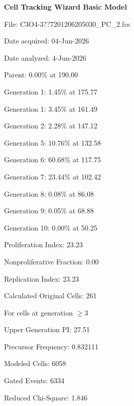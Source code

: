 \documentclass[UTF8,10pt,a4paper,fontset=fandol]{ctexart}
\begin{document}
\noindent
\begin{minipage}[t]{0.48\linewidth}
\centering
{}
\end{minipage}
\hfill
\begin{minipage}[t]{0.48\linewidth}
\small
\textbf{Cell Tracking Wizard Basic Model}

File: C3O4-3??7201206205030\_PC\_2.fcs

Date acquired: 04-Jun-2026

Date analyzed: 4-Jun-2026

Parent: 0.00\% at 190.00

Generation 1: 1.45\% at 175.77

Generation 1: 3.45\% at 161.49

Generation 2: 2.28\% at 147.12

Generation 5: 10.76\% at 132.58

Generation 6: 60.68\% at 117.75

Generation 7: 23.44\% at 102.42

Generation 8: 0.08\% at 86.08

Generation 9: 0.05\% at 68.88

Generation 10: 0.00\% at 50.25

\medskip
Proliferation Index: 23.23

Nonproliferative Fraction: 0.00

Replication Index: 23.23

Calculated Original Cells: 261

\medskip
For cells at generation $\geq 3$

Upper Generation PI: 27.51

Precursor Frequency: 0.832111

\medskip
Modeled Cells: 6058

Gated Events: 6334

Reduced Chi-Square: 1.846
\end{minipage}

\vspace{2cm}
\end{document}
